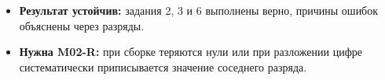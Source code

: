 \begin{resultbox}[Критерий]
  \begin{itemize}
    \item \textbf{Результат устойчив:} задания 2, 3 и 6 выполнены верно, причины
      ошибок объяснены через разряды.
    \item \textbf{Нужна M02-R:} при сборке теряются нули или при разложении
      цифре систематически приписывается значение соседнего разряда.
  \end{itemize}
\end{resultbox}
